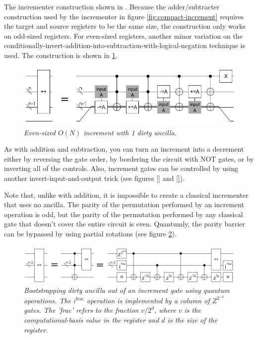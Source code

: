 \documentclass[twocolumn]{article}
\begin{document}
The incrementer construction shown in .
Because the adder/subtracter construction used by the incrementer in figure \ref{fig:compact-increment} requires the target and source registers to be the same size, the construction only works on odd-sized registers.
For even-sized registers, another minor variation on the conditionally-invert-addition-into-subtraction-with-logical-negation technique is used.
The construction is shown in \ref{fig:compact-increment-even}.

\begin{figure}
  \centering
  \includegraphics[totalheight=2cm]{compact-increment-even.png}
  \caption{\em Even-sized $O(N)$ increment with 1 dirty ancilla.}
  \label{fig:compact-increment-even}
\end{figure}

As with addition and subtraction, you can turn an increment into a decrement either by reversing the gate order, by bordering the circuit with NOT gates, or by inverting all of the controls.
Also, increment gates can be controlled by using another invert-input-and-output trick (see figures \ref{} and \ref{}).

Note that, unlike with addition, it is impossible to create a classical incrementer that uses no ancilla.
The parity of the permutation performed by an increment operation is odd, but the parity of the permutation performed by any classical gate that doesn't cover the entire circuit is even.
Quantumly, the parity barrier can be bypassed by using partial rotations (see figure \ref{fig:bootstrap-ancilla}).

\begin{figure}
  \centering
  \includegraphics[totalheight=1.4cm]{ancilla-bootstrap.png}
  \caption{\em Bootstrapping dirty ancilla out of an increment gate using quantum operations.
  The $i^{\text{frac}}$ operation is implemented by a column of $Z^{2^{-k}}$ gates.
  The 'frac' refers to the fraction $v/2^d$, where $v$ is the computational-basis value in the register and $d$ is the size of the register.}
  \label{fig:bootstrap-ancilla}
\end{figure}
\end{document}
